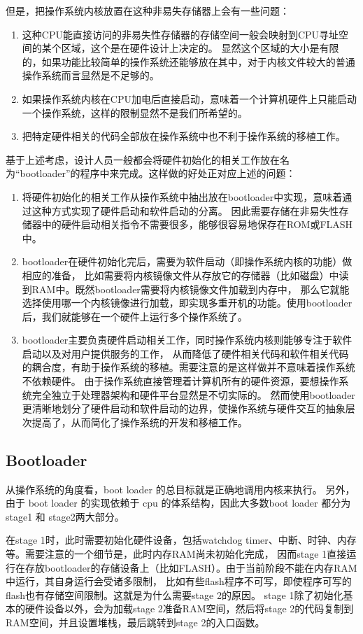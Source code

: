 但是，把操作系统内核放置在这种非易失存储器上会有一些问题：
\begin{enumerate}
  \item 这种CPU能直接访问的非易失性存储器的存储空间一般会映射到CPU寻址空间的某个区域，这个是在硬件设计上决定的。
显然这个区域的大小是有限的，如果功能比较简单的操作系统还能够放在其中，对于内核文件较大的普通操作系统而言显然是不足够的。
  \item 如果操作系统内核在CPU加电后直接启动，意味着一个计算机硬件上只能启动一个操作系统，这样的限制显然不是我们所希望的。
  \item 把特定硬件相关的代码全部放在操作系统中也不利于操作系统的移植工作。
\end{enumerate}

基于上述考虑，设计人员一般都会将硬件初始化的相关工作放在名为“bootloader”的程序中来完成。这样做的好处正对应上述的问题：
\begin{enumerate}
  \item 将硬件初始化的相关工作从操作系统中抽出放在bootloader中实现，意味着通过这种方式实现了硬件启动和软件启动的分离。
因此需要存储在非易失性存储器中的硬件启动相关指令不需要很多，能够很容易地保存在ROM或FLASH中。
  \item bootloader在硬件初始化完后，需要为软件启动（即操作系统内核的功能）做相应的准备，
比如需要将内核镜像文件从存放它的存储器（比如磁盘）中读到RAM中。既然bootloader需要将内核镜像文件加载到内存中，
那么它就能选择使用哪一个内核镜像进行加载，即实现多重开机的功能。使用bootloader后，我们就能够在一个硬件上运行多个操作系统了。
  \item bootloader主要负责硬件启动相关工作，同时操作系统内核则能够专注于软件启动以及对用户提供服务的工作，
从而降低了硬件相关代码和软件相关代码的耦合度，有助于操作系统的移植。需要注意的是这样做并不意味着操作系统不依赖硬件。
由于操作系统直接管理着计算机所有的硬件资源，要想操作系统完全独立于处理器架构和硬件平台显然是不切实际的。
然而使用bootloader更清晰地划分了硬件启动和软件启动的边界，使操作系统与硬件交互的抽象层次提高了，从而简化了操作系统的开发和移植工作。
\end{enumerate}

\subsection{Bootloader}
从操作系统的角度看，boot loader 的总目标就是正确地调用内核来执行。
另外，由于 boot loader 的实现依赖于 cpu 的体系结构，因此大多数boot loader 都分为 stage1 和 stage2两大部分。

在stage 1时，此时需要初始化硬件设备，包括watchdog timer、中断、时钟、内存等。需要注意的一个细节是，此时内存RAM尚未初始化完成，
因而stage 1直接运行在存放bootloader的存储设备上（比如FLASH）。由于当前阶段不能在内存RAM中运行，其自身运行会受诸多限制，
比如有些flash程序不可写，即使程序可写的flash也有存储空间限制。这就是为什么需要stage 2的原因。
stage 1除了初始化基本的硬件设备以外，会为加载stage 2准备RAM空间，然后将stage 2的代码复制到RAM空间，并且设置堆栈，最后跳转到stage 2的入口函数。

